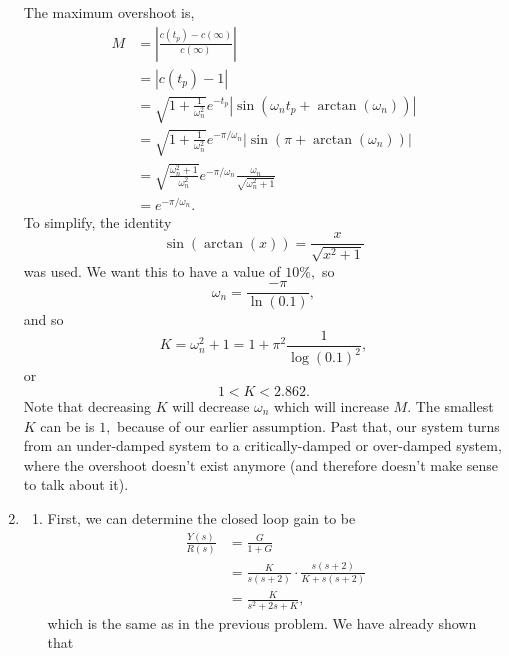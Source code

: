\documentclass{article}
\numberwithin{equation}{section}
\begin{document}
\begin{enumerate}[label=\textbf{1.\arabic*}]
    The maximum overshoot is,
    \begin{align}
        M &= \left|\frac{c(t_p) - c(\infty)}{c(\infty)}\right| \\ 
        &= |c(t_p) - 1| \\ 
        &= \sqrt{1+\frac{1}{\omega_n^2}}e^{-t_p}|\sin\left(\omega_n t_p + \arctan(\omega_n)\right)| \\ 
        &= \sqrt{1+\frac{1}{\omega_n^2}} e^{-\pi/\omega_n}|\sin(\pi + \arctan(\omega_n))| \\ 
        &= \sqrt{\frac{\omega_n^2+1}{\omega_n^2}} e^{-\pi/\omega_n} \frac{\omega_n}{\sqrt{\omega_n^2+1}} \\ 
        &= e^{-\pi/\omega_n}.
    \end{align}
    To simplify, the identity 
    \begin{equation}
        \sin(\arctan(x)) = \frac{x}{\sqrt{x^2+1}}
    \end{equation}
    was used. We want this to have a value of $10\%,$ so 
    \begin{equation}
        \omega_n = \frac{-\pi}{\ln(0.1)},
    \end{equation}
    and so 
    \begin{equation}
        K = \omega_n^2 +1 = 1 + \pi^2 \frac{1}{\log(0.1)^2},
    \end{equation}
    or 
    \begin{equation}
        \boxed{1 < K < 2.862.}
    \end{equation}
    Note that decreasing $K$ will decrease $\omega_n$ which will increase $M.$ The smallest $K$ can be is $1,$ because of our earlier assumption. Past that, our system turns from an under-damped system to a critically-damped or over-damped system, where the overshoot doesn't exist anymore (and therefore doesn't make sense to talk about it). 
    \item \begin{enumerate}[label=(\alph*)]
        \item First, we can determine the closed loop gain to be 
        \begin{align}
            \frac{Y(s)}{R(s)} &= \frac{G}{1+G} \\ 
            &= \frac{K}{s(s+2)} \cdot \frac{s(s+2)}{K+s(s+2)} \\ 
            &= \frac{K}{s^2+2s+K}, 
        \end{align}
        which is the same as in the previous problem. We have already shown that 
        \begin{equation}

\end{equation}
\end{enumerate}
\end{enumerate}
\end{document}
